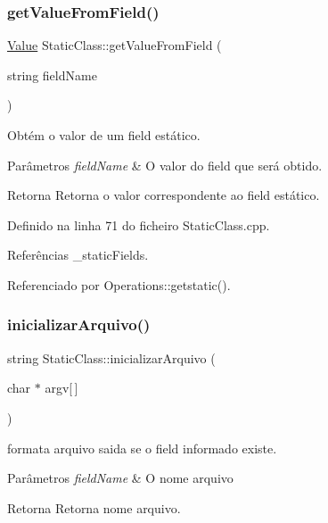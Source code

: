 \subsubsection{\texorpdfstring{get\+Value\+From\+Field()}{getValueFromField()}}
{\footnotesize\ttfamily \hyperlink{structValue}{Value} Static\+Class\+::get\+Value\+From\+Field (\begin{DoxyParamCaption}\item[{string}]{field\+Name }\end{DoxyParamCaption})}



Obtém o valor de um field estático. 


\begin{DoxyParams}{Parâmetros}
{\em field\+Name} & O valor do field que será obtido. \\
\hline
\end{DoxyParams}
\begin{DoxyReturn}{Retorna}
Retorna o valor correspondente ao field estático. 
\end{DoxyReturn}


Definido na linha 71 do ficheiro Static\+Class.\+cpp.



Referências \+\_\+static\+Fields.



Referenciado por Operations\+::getstatic().

\mbox{\label{classStaticClass_a6acf891b8d9119fddeec52169b364d66}} 
\subsubsection{\texorpdfstring{inicializar\+Arquivo()}{inicializarArquivo()}}
{\footnotesize\ttfamily string Static\+Class\+::inicializar\+Arquivo (\begin{DoxyParamCaption}\item[{char $\ast$}]{argv\mbox{[}$\,$\mbox{]} }\end{DoxyParamCaption})}



formata arquivo saida se o field informado existe. 


\begin{DoxyParams}{Parâmetros}
{\em field\+Name} & O nome arquivo \\
\hline
\end{DoxyParams}
\begin{DoxyReturn}{Retorna}
Retorna nome arquivo. 
\end{DoxyReturn}


